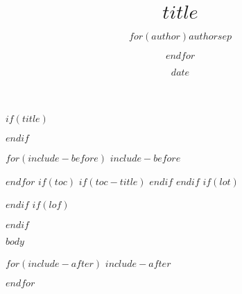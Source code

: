 \documentclass[$if(fontsize)$$fontsize$,$endif$$if(lang)$$babel-lang$,$endif$$if(papersize)$$papersize$paper,$endif$$for(classoption)$$classoption$$sep$,$endfor$]{$documentclass$}
\title{$title$}
\author{$for(author)$$author$$sep$ \and $endfor$}
\date{$date$}
\begin{document}
$if(title)$
\maketitle
$endif$

$for(include-before)$
$include-before$

$endfor$
$if(toc)$
$if(toc-title)$
\renewcommand*\contentsname{$toc-title$}
$endif$
\tableofcontents
$endif$
$if(lot)$
\listoftables
$endif$
$if(lof)$
\listoffigures
$endif$

$body$

$for(include-after)$
$include-after$

$endfor$
\end{document}
